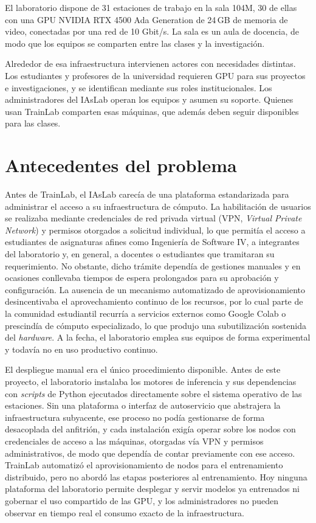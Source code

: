 El laboratorio dispone de 31 estaciones de trabajo en la sala 104M, 30 de ellas con una GPU NVIDIA RTX 4500 Ada Generation de 24\,GB de memoria de video, conectadas por una red de 10 Gbit/s. La sala es un aula de docencia, de modo que los equipos se comparten entre las clases y la investigación.

Alrededor de esa infraestructura intervienen actores con necesidades distintas. Los estudiantes y profesores de la universidad requieren GPU para sus proyectos e investigaciones, y se identifican mediante sus roles institucionales. Los administradores del IAsLab operan los equipos y asumen su soporte. Quienes usan TrainLab comparten esas máquinas, que además deben seguir disponibles para las clases.

\section{Antecedentes del problema}

Antes de TrainLab, el IAsLab carecía de una plataforma estandarizada para administrar el acceso a su infraestructura de cómputo. La habilitación de usuarios se realizaba mediante credenciales de red privada virtual (VPN, \emph{Virtual Private Network}) y permisos otorgados a solicitud individual, lo que permitía el acceso a estudiantes de asignaturas afines como Ingeniería de Software IV, a integrantes del laboratorio y, en general, a docentes o estudiantes que tramitaran su requerimiento. No obstante, dicho trámite dependía de gestiones manuales y en ocasiones conllevaba tiempos de espera prolongados para su aprobación y configuración. La ausencia de un mecanismo automatizado de aprovisionamiento desincentivaba el aprovechamiento continuo de los recursos, por lo cual parte de la comunidad estudiantil recurría a servicios externos como Google Colab o prescindía de cómputo especializado, lo que produjo una subutilización sostenida del \emph{hardware}. A la fecha, el laboratorio emplea sus equipos de forma experimental y todavía no en uso productivo continuo.

El despliegue manual era el único procedimiento disponible. Antes de este proyecto, el laboratorio instalaba los motores de inferencia y sus dependencias con \emph{scripts} de Python ejecutados directamente sobre el sistema operativo de las estaciones. Sin una plataforma o interfaz de autoservicio que abstrajera la infraestructura subyacente, ese proceso no podía gestionarse de forma desacoplada del anfitrión, y cada instalación exigía operar sobre los nodos con credenciales de acceso a las máquinas, otorgadas vía VPN y permisos administrativos, de modo que dependía de contar previamente con ese acceso. TrainLab automatizó el aprovisionamiento de nodos para el entrenamiento distribuido, pero no abordó las etapas posteriores al entrenamiento. Hoy ninguna plataforma del laboratorio permite desplegar y servir modelos ya entrenados ni gobernar el uso compartido de las GPU, y los administradores no pueden observar en tiempo real el consumo exacto de la infraestructura.

